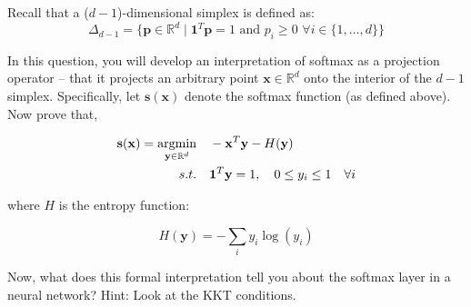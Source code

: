 
Recall that a ($d-1$)-dimensional simplex is defined as: 
\begin{equation}
    \Delta_{d - 1} = \{\mathbf{p} \in \mathbb{R}^{d} \mid \mathbf{1}^{T}\mathbf{p} = 1 \text{ and } p_i \ge 0 \,\, \forall i \in \{1,\ldots,d\} \}
\end{equation}

In this question, you will develop an interpretation of softmax as a projection operator -- that it projects an arbitrary point $\mathbf{x} \in \mathbb{R}^d$ onto the interior of the $d - 1$ simplex. Specifically, let $\mathbf{s}(\mathbf{x})$ denote the softmax function (as defined above). Now prove that, 


\begin{align}
    \mathbf{s}(\mathbf{x}) =  \argmin_{\mathbf{y} \in \mathbb{R}^d} &\quad  -\mathbf{x}^{T}\mathbf{y} - H(\mathbf{y}) \\ 
     \st & \quad \mathbf{1}^{T}\mathbf{y} = 1, \quad 0 \le y_i \le 1 \quad \forall i
\end{align}

where $H$ is the entropy function: 

\begin{equation}
    H(\mathbf{y}) = - \sum_{i}y_{i}\log(y_{i})
\end{equation}

Now, what does this formal interpretation tell you about the softmax layer in a neural network? 
Hint: Look at the KKT conditions.
